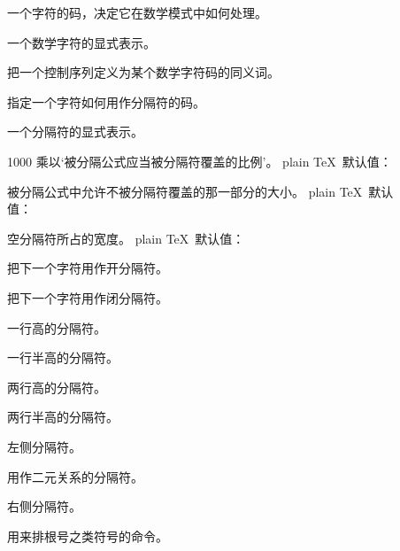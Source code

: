 \documentclass[a4paper]{rapport3}
\newenvironment{inventory}{\begin{description}}{\end{description}}
\begin{document}
\begin{inventory}
\item [] 
      一个字符的码，决定它在数学模式中如何处理。

\item [] 
      一个数学字符的显式表示。

\item [] 
      把一个控制序列定义为某个数学字符码的同义词。

\item [] 
      指定一个字符如何用作分隔符的码。

\item [] 
      一个分隔符的显式表示。

\item [] 
      1000 乘以`被分隔公式应当被分隔符覆盖的比例'。
      plain \TeX\ 默认值：~

\item [] 
      被分隔公式中允许不被分隔符覆盖的那一部分的大小。
      plain \TeX\ 默认值：~\n{5pt}

\item [] 
      空分隔符所占的宽度。
      plain \TeX\ 默认值：~\n{1.2pt}

\item [] 
      把下一个字符用作开分隔符。

\item [] 
      把下一个字符用作闭分隔符。

\item [] 
      一行高的分隔符。

\item [] 
      一行半高的分隔符。

\item [] 
      两行高的分隔符。

\item [] 
      两行半高的分隔符。

\item []
      左侧分隔符。

\item []
      用作二元关系的分隔符。

\item []
      右侧分隔符。

\item [] 
      用来排根号之类符号的命令。


\end{inventory}
\end{document}
